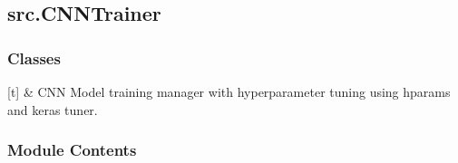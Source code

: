 \documentclass[letterpaper,10pt,english]{sphinxmanual}
\begin{document}
\sphinxstepscope


\subsection{src.CNNTrainer}
\label{\detokenize{autoapi/src/CNNTrainer/index:module-src.CNNTrainer}}\label{\detokenize{autoapi/src/CNNTrainer/index:src-cnntrainer}}\label{\detokenize{autoapi/src/CNNTrainer/index::doc}}

\subsubsection{Classes}
\label{\detokenize{autoapi/src/CNNTrainer/index:classes}}

\begin{savenotes}\sphinxattablestart
\sphinxthistablewithglobalstyle
\sphinxthistablewithnovlinesstyle
\centering
\begin{tabulary}{\linewidth}[t]{}
\sphinxtoprule
\sphinxtableatstartofbodyhook
\sphinxAtStartPar
{\hyperref[\detokenize{autoapi/src/CNNTrainer/index:src.CNNTrainer.CNNTrainer}]{}}
&
\sphinxAtStartPar
CNN Model training manager with hyperparameter tuning using hparams and keras tuner.
\\
\sphinxbottomrule
\end{tabulary}
\sphinxtableafterendhook\par
\sphinxattableend\end{savenotes}


\subsubsection{Module Contents}
\label{\detokenize{autoapi/src/CNNTrainer/index:module-contents}}

\begin{fulllineitems}
\label{\detokenize{autoapi/src/CNNTrainer/index:src.CNNTrainer.CNNTrainer}}
\pysigstartsignatures
\pysiglinewithargsret
{}
{\sphinxparamcomma {}}
{}
\pysigstopsignatures
\end{fulllineitems}
\end{document}
